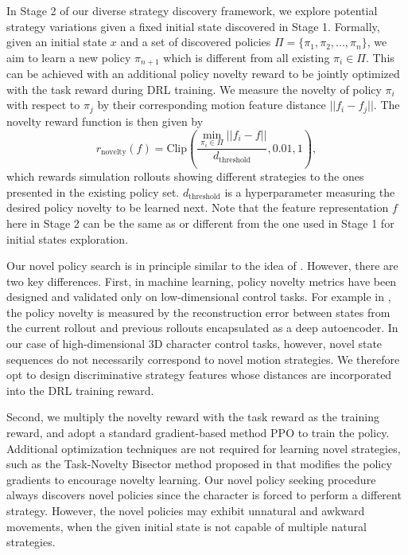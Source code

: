 In Stage 2 of our diverse strategy discovery framework, we explore potential strategy variations given a fixed initial state discovered in Stage 1. Formally, given an initial state $x$ and a set of discovered policies $\Pi = \{\pi_1, \pi_2, ..., \pi_n\}$, we aim to learn a new policy $\pi_{n+1}$ which is different from all existing $\pi_i \in \Pi$. This can be achieved with an additional policy novelty reward to be jointly optimized with the task reward during DRL training. We measure the novelty of policy $\pi_i$ with respect to $\pi_j$ by their corresponding motion feature distance $||f_i - f_j||$. The novelty reward function is then given by
\begin{equation}
    r_\text{novelty}(f) = \text{Clip}\left(\frac{\min_{\pi_i \in \Pi}{||f_i - f||}}{d_\text{threshold}}, 0.01, 1\right) ,
\end{equation}
which rewards simulation rollouts showing different strategies to the ones presented in the existing policy set. $d_\text{threshold}$ is a hyperparameter measuring the desired policy novelty to be learned next. Note that the feature representation $f$ here in Stage 2 can be the same as or different from the one used in Stage 1 for initial states exploration.

Our novel policy search is in principle similar to the idea of \cite{zhang2019novel-policies,Sun2020novel-policies}. However, there are two key differences. First, in machine learning, policy novelty metrics have been designed and validated only on low-dimensional control tasks. For example in \cite{zhang2019novel-policies}, the policy novelty is measured by the reconstruction error between states from the current rollout and previous rollouts encapsulated as a deep autoencoder. In our case of high-dimensional 3D character control tasks, however, novel state sequences do not necessarily correspond to novel motion strategies. We therefore opt to design discriminative strategy features whose distances are incorporated into the DRL training reward.

Second, we multiply the novelty reward with the task reward as the training reward, and adopt a standard gradient-based method PPO to train the policy. Additional optimization techniques are not required for learning novel strategies, such as the Task-Novelty Bisector method proposed in \cite{zhang2019novel-policies} that modifies the policy gradients to encourage novelty learning. Our novel policy seeking procedure always discovers novel policies since the character is forced to perform a different strategy. However, the novel policies may exhibit unnatural and awkward movements, when the given initial state is not capable of multiple natural strategies.